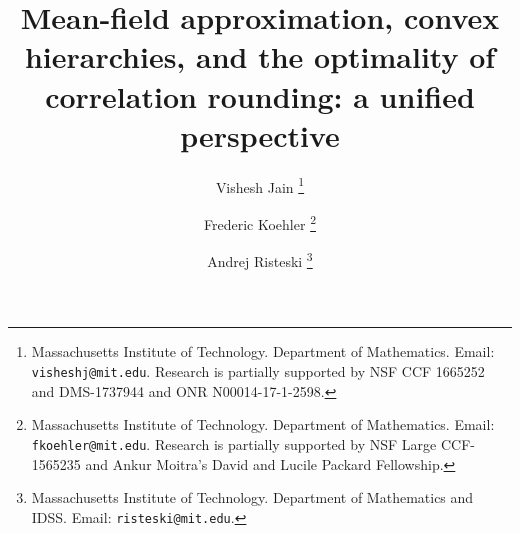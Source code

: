 \documentclass[11pt, oneside, english]{article}
\theoremstyle{definition}
\theoremstyle{plain}
\begin{document}
\title{Mean-field approximation, convex hierarchies, and the 
optimality of correlation rounding: a unified perspective}
\author{Vishesh Jain \thanks{Massachusetts Institute of Technology. Department of Mathematics. Email: {\tt visheshj@mit.edu}. Research is partially supported by NSF CCF 1665252 and DMS-1737944 and ONR N00014-17-1-2598.}
\and Frederic Koehler \thanks{Massachusetts Institute of Technology. Department of Mathematics. Email: {\tt fkoehler@mit.edu}. Research is partially supported by NSF Large CCF-1565235 and Ankur Moitra's David and Lucile Packard Fellowship.}
\and Andrej Risteski \thanks{Massachusetts Institute of Technology. Department of Mathematics and IDSS. Email: {\tt risteski@mit.edu}.}}
\date{}
\maketitle
\end{document}
